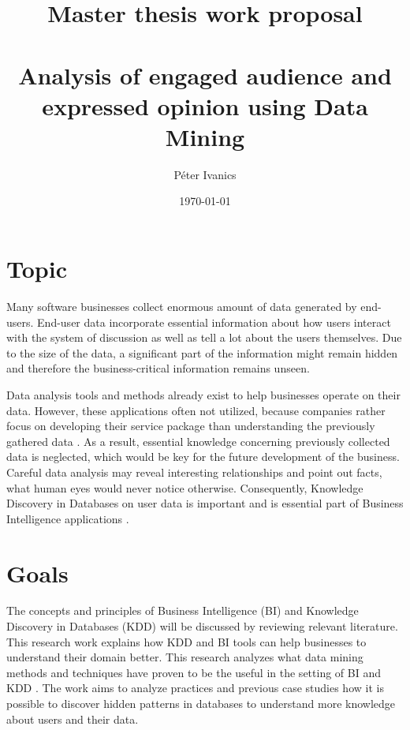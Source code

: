 \documentclass[english]{tktltiki}
\begin{document}
\onehalfspacing

\title{Master thesis work proposal \\ \\
Analysis of engaged audience and expressed opinion using Data Mining}
\author{P\'eter Ivanics}

\date{\today}

\maketitle

%
%
%

\section{Topic}
	Many software businesses collect enormous amount of data generated by end-users. End-user data incorporate essential information about how users interact with the system of discussion as well as tell a lot about the users themselves. Due to the size of the data, a significant part of the information might remain hidden and therefore the business-critical information remains unseen. 
	
	Data analysis tools and methods already exist to help businesses operate on their data. However, these applications often not utilized, because companies rather focus on developing their service package than understanding the previously gathered data \cite{inmon2007tapping}. As a result, essential knowledge concerning previously collected data is neglected, which would be key for the future development of the business. Careful data analysis may reveal interesting relationships and point out facts, what human eyes would never notice otherwise. Consequently, Knowledge Discovery in Databases on user data is important and is essential part of Business Intelligence applications \cite{zarsky2002mine}. 

\section{Goals}
	The concepts and principles of Business Intelligence (BI) and Knowledge Discovery in Databases (KDD) will be discussed by reviewing relevant literature. This research work explains how KDD and BI tools can help businesses to understand their domain better. This research analyzes what data mining methods and techniques have proven to be the useful in the setting of BI and KDD \cite{bose2001business}. The work aims to analyze practices and previous case studies how it is possible to discover hidden patterns in databases to understand more knowledge about users and their data. 
	
\end{document}
